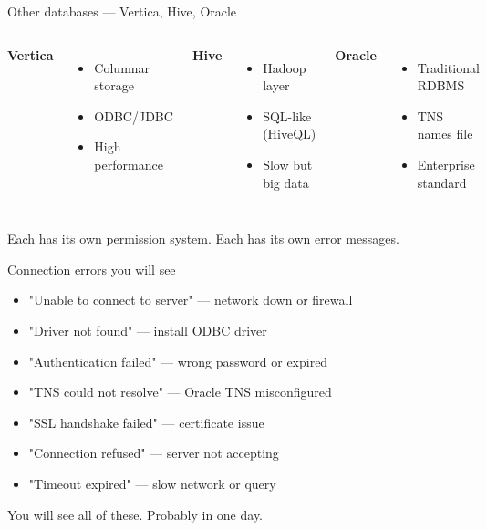 \documentclass[aspectratio=169, 11pt]{beamer}
\begin{document}
	\begin{frame}{Other databases — Vertica, Hive, Oracle}
		\tiny
		\begin{columns}[T]
			\textbf{Vertica}
			\begin{itemize}
				\item Columnar storage
				\item ODBC/JDBC
				\item High performance
			\end{itemize}
			\textbf{Hive}
			\begin{itemize}
				\item Hadoop layer
				\item SQL-like (HiveQL)
				\item Slow but big data
			\end{itemize}
			\textbf{Oracle}
			\begin{itemize}
				\item Traditional RDBMS
				\item TNS names file
				\item Enterprise standard
			\end{itemize}
		\end{columns}
		\vspace{0.1cm}
		\tiny\alert{Each has its own permission system. Each has its own error messages.}
	\end{frame}
	
	\begin{frame}{Connection errors you will see}
		\tiny
		\begin{itemize}
			\item "Unable to connect to server" — network down or firewall
			\item "Driver not found" — install ODBC driver
			\item "Authentication failed" — wrong password or expired
			\item "TNS could not resolve" — Oracle TNS misconfigured
			\item "SSL handshake failed" — certificate issue
			\item "Connection refused" — server not accepting
			\item "Timeout expired" — slow network or query
		\end{itemize}
		\vspace{0.05cm}
		\tiny\alert{You will see all of these. Probably in one day.}
	\end{frame}
	
\end{document}
